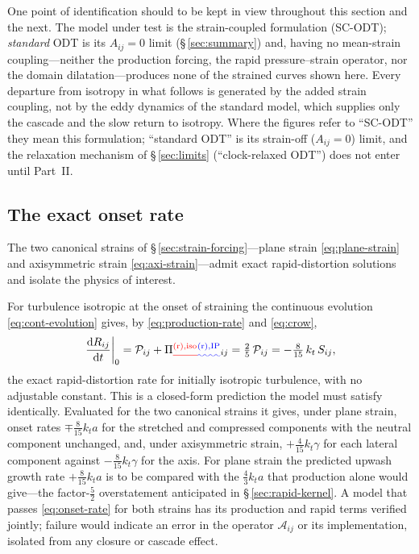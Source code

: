 \documentclass[lineno]{JFM-FLM_Au}
\providecommand{\DIFadd}[1]{{\protect\color{blue}\uwave{#1}}} %
\providecommand{\DIFdel}[1]{{\protect\color{red}\sout{#1}}} %
\providecommand{\DIFaddbegin}{} %
\providecommand{\DIFaddend}{} %
\providecommand{\DIFdelbegin}{} %
\providecommand{\DIFdelend}{} %
\begin{document}
One point of identification should to be kept in view throughout this section
and the next. The model under test is the strain-coupled formulation
(SC-ODT); \emph{standard} ODT is its $A_{ij}=0$ limit
(\S\,\ref{sec:summary}) and, having no mean-strain coupling---neither
the production forcing, the rapid pressure--strain operator, nor the
domain dilatation---produces none of the strained curves shown here.
Every departure from isotropy in what follows is generated by the added
strain coupling, not by the eddy dynamics of the standard model, which
supplies only the cascade and the slow return to isotropy. Where the
figures refer to ``SC-ODT'' they mean this formulation; ``standard ODT''
is its strain-off ($A_{ij}=0$) limit, and the relaxation mechanism of
\S\,\ref{sec:limits} (``clock-relaxed ODT'') does not enter until
Part~II.

\subsection{The exact onset rate}\label{sec:onset}

The two canonical strains of \S\,\ref{sec:strain-forcing}---plane strain
\eqref{eq:plane-strain} and axisymmetric strain
\eqref{eq:axi-strain}---admit exact rapid-distortion solutions and
isolate the physics of interest.

For turbulence isotropic at the onset of straining the continuous
evolution \eqref{eq:cont-evolution} gives, by
\eqref{eq:production-rate} and \eqref{eq:crow},
\begin{equation}
  \left.\frac{\mathrm{d}R_{ij}}{\mathrm{d}t}\right|_{0}
  = \mathcal{P}_{ij}+\Pi\DIFdelbegin \DIFdel{^{(\mathrm r),\mathrm{iso}}}\DIFdelend \DIFaddbegin \DIFadd{^{(\mathrm r),\mathrm{IP}}}\DIFaddend _{ij}
  = \tfrac{2}{5}\,\mathcal{P}_{ij}
  = -\tfrac{8}{15}\,k_t\,S_{ij},
  \label{eq:onset-rate}
\end{equation}
the exact rapid-distortion rate for initially isotropic turbulence, with
no adjustable constant. This is a
closed-form prediction the model must satisfy identically. Evaluated for the two canonical strains it gives, under
plane strain\DIFaddbegin \DIFadd{~\eqref{eq:plane-strain}}\DIFaddend , onset rates $\mp\tfrac{8}{15}k_ta$ for the stretched and
compressed components with the neutral component unchanged, and, under
axisymmetric strain\DIFaddbegin \DIFadd{~\eqref{eq:axi-strain}}\DIFaddend , $+\tfrac{4}{15}k_t\gamma$ for each lateral
component against $-\tfrac{8}{15}k_t\gamma$ for the axis. For plane
strain the predicted upwash growth rate $+\tfrac{8}{15}k_ta$ is to be
compared with the $\tfrac43k_ta$ that production alone would give---the
factor-$\tfrac52$ overstatement anticipated in
\S\,\ref{sec:rapid-kernel}. A model that passes \eqref{eq:onset-rate}
for both strains has its production and rapid terms verified jointly;
failure would indicate an error in the operator $\mathcal{A}_{ij}$ or
its implementation, isolated from any closure or cascade effect.
\end{document}

